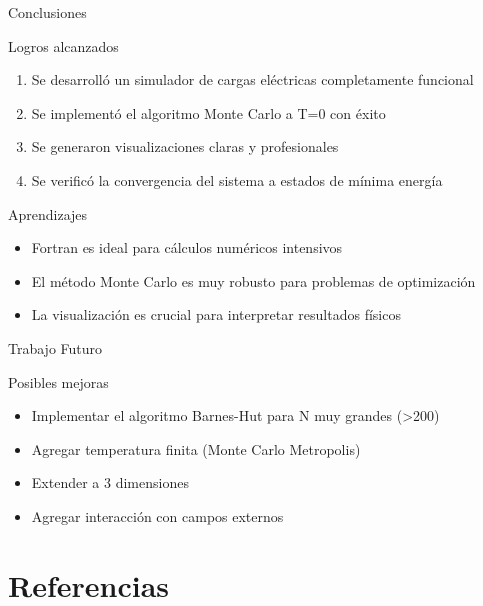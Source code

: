 \documentclass[10pt, aspectratio=169]{beamer}
\begin{document}
\begin{frame}{Conclusiones}
  \begin{block}{Logros alcanzados}
    \begin{enumerate}
      \item Se desarrolló un simulador de cargas eléctricas completamente funcional
      \item Se implementó el algoritmo Monte Carlo a T=0 con éxito
      \item Se generaron visualizaciones claras y profesionales
      \item Se verificó la convergencia del sistema a estados de mínima energía
    \end{enumerate}
  \end{block}

  \pause

  \begin{exampleblock}{Aprendizajes}
    \begin{itemize}
      \item Fortran es ideal para cálculos numéricos intensivos
      \item El método Monte Carlo es muy robusto para problemas de optimización
      \item La visualización es crucial para interpretar resultados físicos
    \end{itemize}
  \end{exampleblock}
\end{frame}

\begin{frame}{Trabajo Futuro}
  \begin{alertblock}{Posibles mejoras}
    \begin{itemize}
      \item Implementar el algoritmo Barnes-Hut para N muy grandes (>200)
      \item Agregar temperatura finita (Monte Carlo Metropolis)
      \item Extender a 3 dimensiones
      \item Agregar interacción con campos externos
    \end{itemize}
  \end{alertblock}
\end{frame}


\section{Referencias}
\end{document}

